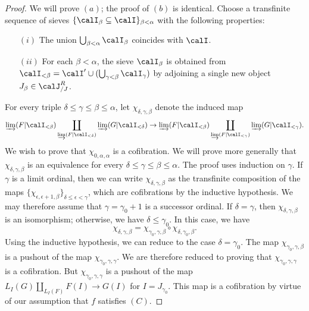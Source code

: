 \begin{Model Categories}
\begin{Didn't Read}
\begin{proof}
We will prove $(a)$; the proof of $(b)$ is identical. Choose a transfinite sequence of sieves
$\{ \calI_{\beta} \subseteq \calI \}_{ \beta < \alpha }$ with the following properties:
\begin{itemize}
\item[$(i)$] The union $\bigcup_{\beta < \alpha} \calI_{\beta}$ coincides with $\calI$.
\item[$(ii)$] For each $\beta < \alpha$, the sieve $\calI_{\beta}$ is obtained
from $\calI_{< \beta} = \calI' \cup (\bigcup_{ \gamma < \beta} \calI_{\gamma})$
by adjoining a single new object $J_{\beta} \in \calJ^{R}_{/J}$. 
\end{itemize}
For every triple $\delta \leq \gamma \leq \beta \leq \alpha$, let
$\chi_{ \delta, \gamma, \beta}$ denote the induced map
$$ \varinjlim( F| \calI_{< \beta}) \coprod_{ \varinjlim(F | \calI_{< \delta})}
\varinjlim( G| \calI_{< \delta}) \rightarrow
\varinjlim( F | \calI_{< \beta} ) \coprod_{ \varinjlim( F| \calI_{< \gamma}) }
\varinjlim( G| \calI_{< \gamma} ).$$
We wish to prove that $\chi_{0, \alpha, \alpha}$ is a cofibration.
We will prove more generally that $\chi_{\delta, \gamma, \beta}$ is an
equivalence for every $\delta \leq \gamma \leq \beta \leq \alpha$.
The proof uses induction on $\gamma$. If $\gamma$ is a limit ordinal, 
then we can write $\chi_{\delta, \gamma, \beta}$ as the transfinite composition
of the maps $\{ \chi_{ \epsilon, \epsilon + 1, \beta} \}_{\delta \leq \epsilon < \gamma}$, which are cofibrations by the inductive hypothesis. We may therefore assume that
$\gamma = \gamma_0 + 1$ is a successor ordinal. If $\delta = \gamma$, then
$\chi_{\delta, \gamma, \beta}$ is an isomorphism; otherwise, we have
$\delta \leq \gamma_0$. In this case, we have
$$ \chi_{ \delta, \gamma, \beta} = \chi_{ \gamma_0, \gamma, \beta} \circ \chi_{ \delta, \gamma_0, \beta}.$$
Using the inductive hypothesis, we can reduce to the case $\delta = \gamma_0$. The map
$\chi_{\gamma_0, \gamma, \beta}$ is a pushout of the map $\chi_{\gamma_0, \gamma, \gamma}$. We are therefore reduced to proving that $\chi_{\gamma_0, \gamma, \gamma}$
is a cofibration. But $\chi_{\gamma_0, \gamma, \gamma}$ is a pushout of the map
$L_{I}(G) \coprod_{ L_{I}(F)} F(I) \rightarrow G(I)$ for $I = J_{\gamma_0}$.
This map is a cofibration by virtue of our assumption that $f$ satisfies $(C)$.
\end{proof}


\end{Didn't Read}
\end{Model Categories}
